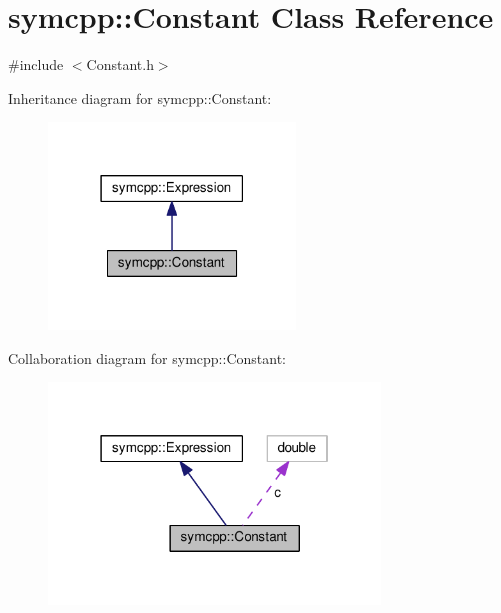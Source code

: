 \hypertarget{classsymcpp_1_1Constant}{}\section{symcpp\+:\+:Constant Class Reference}
\label{classsymcpp_1_1Constant}


{\ttfamily \#include $<$Constant.\+h$>$}



Inheritance diagram for symcpp\+:\+:Constant\+:\nopagebreak
\begin{figure}[H]
\begin{center}
\leavevmode
\includegraphics[width=186pt]{classsymcpp_1_1Constant__inherit__graph}
\end{center}
\end{figure}


Collaboration diagram for symcpp\+:\+:Constant\+:\nopagebreak
\begin{figure}[H]
\begin{center}
\leavevmode
\includegraphics[width=250pt]{classsymcpp_1_1Constant__coll__graph}
\end{center}
\end{figure}
